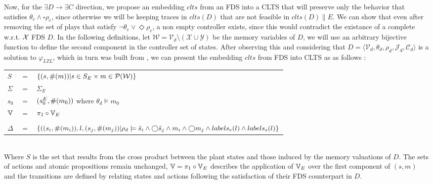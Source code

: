 Now,  for the $\exists D \rightarrow \exists C$ direction, we propose an embedding $clts$ from an FDS into a CLTS that will preserve only the behavior that satisfies $\theta_e \wedge \square \rho_e$, since otherwise we will be keeping traces in $clts(D)$ that are not feasible in $clts(D)\parallel E$. We can show that even after removing the set of plays that satisfy $\neg \theta_e \vee \Diamond \rho_e$, a non empty controller exists, since this would contradict the existance of a complete w.r.t. ${\mathcal{X}}$ FDS $D$. In the following definitions, let $\mathcal{W}= \mathcal{V}_{d}\setminus (\mathcal{X} \cup \mathcal{Y})$ be the memory variables of $D$, we will use an arbitrary bijective function \enumSetDef to define the second component in the controller set of states. After observing this and considering that  $D= \langle \mathcal{V}_d, \theta_d, \rho_d, \mathcal{J}_d, \mathcal{C}_d\rangle$ is a solution to $\varphi_{LTL}$, which in turn was built from \controlProblemDef,  we can present the embedding $clts$ from FDS into CLTS as  as follows :

\vspace{1em}
\begin{tabular}{ l c l }
	$S$ &$=$& $\{(s,\#(m)) | s \in S_E \times m \in \mathcal{P}(\mathcal{W}) \}$\\
	$\Sigma$ &$=$&$\Sigma_E$\\	
	$s_0$&$=$&$(s_0^{E}, \#(m_0))$ where $\theta_d \models m_0$ \\
	${\mathbb{V}}$&$=$&$\pi_1 \circ {\mathbb{V}}_E$\\
	&&\\
	$\Delta$&$=$&$\{((s_i,\#(m_i)),l,(s_j,\#(m_j))| \rho_d \models \hat{s}_{i} \wedge \bigcirc \hat{s}_{j} \wedge m_i \wedge \bigcirc m_j \wedge labels_e(l) \wedge labels_s(l) \}$\\
\end{tabular}
\vspace{1em}
\\
Where $S$ is the set that results from the cross product between the plant states and those induced by the memory valuations of $D$. The sets of actions and atomic propositions remain unchanged, ${\mathbb{V}}=\pi_1 \circ {\mathbb{V}}_E$ describes the application of ${\mathbb{V}}_E$ over the first component of $(s,m)$ and the transitions are defined by relating states and actions following the satisfaction of their FDS counterpart in $D$.


